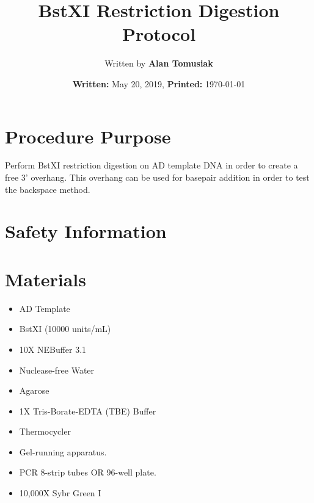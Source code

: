 \documentclass{ssiBio}
\title{BstXI Restriction Digestion Protocol}
\author{Written by \textbf{Alan Tomusiak}}
\date{\textbf{Written:} May 20, 2019, \textbf{Printed:} \today{}}
\begin{document}
\maketitle
\section{Procedure Purpose}
Perform BstXI restriction digestion on AD template DNA in order to create a free 3' overhang. This overhang can be used for basepair addition in order to test the backspace method.

\section{Safety Information}
\begin{safety}
  \begin{enumerate}
    \SYBRGOLD
  \end{enumerate}
\end{safety}

\section{Materials}
\begin{itemize}
  \item{AD Template}
  \item{BstXI (10000 units/mL)}
  \item{10X NEBuffer 3.1}
  \item{Nuclease-free Water}
  \item{Agarose}
  \item{1X Tris-Borate-EDTA (TBE) Buffer}
  \item{Thermocycler}
  \item{Gel-running apparatus.}
  \item{PCR 8-strip tubes OR 96-well plate.}
  \item{10,000X Sybr Green I}
\end{itemize}
\end{document}
